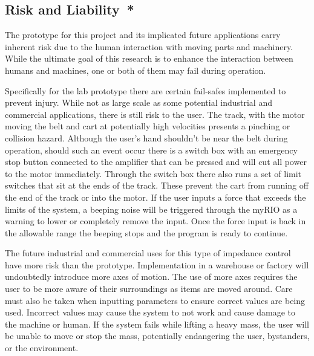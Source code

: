 
\subsection*{Risk and Liability{{\color{red}\ *}}}
The prototype for this project and its implicated future applications carry inherent risk due to the human interaction with moving parts and machinery. While the ultimate goal of this research is to enhance the interaction between humans and machines, one or both of them may fail during operation.

Specifically for the lab prototype there are certain fail-safes implemented to prevent injury. While not as large scale as some potential industrial and commercial applications, there is still risk to the user. The track, with the motor moving the belt and cart at potentially high velocities presents a pinching or collision hazard. Although the user's hand shouldn't be near the belt during operation, should such an event occur there is a switch box with an emergency stop button connected to the amplifier that can be pressed and will cut all power to the motor immediately. Through the switch box there also runs a set of limit switches that sit at the ends of the track. These prevent the cart from running off the end of the track or into the motor. If the user inputs a force that exceeds the limits of the system, a beeping noise will be triggered through the myRIO as a warning to lower or completely remove the input. Once the force input is back in the allowable range the beeping stops and the program is ready to continue.

The future industrial and commercial uses for this type of impedance control have more risk than the prototype. Implementation in a warehouse or factory will undoubtedly introduce more axes of motion. The use of more axes requires the user to be more aware of their surroundings as items are moved around. Care must also be taken when inputting parameters to ensure correct values are being used. Incorrect values may cause the system to not work and cause damage to the machine or human. If the system fails while lifting a heavy mass, the user will be unable to move or stop the mass, potentially endangering the user, bystanders, or the environment.
